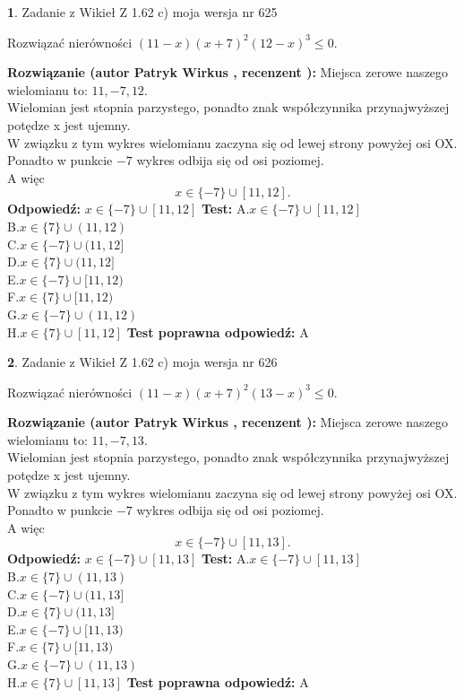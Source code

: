 \documentclass[12pt, a4paper]{article}
\theoremstyle{definition} %
\newtheorem{zad}{}
\newcommand{\zadStart}[1]{\begin{zad}#1\newline}
\newcommand{\zadStop}{\end{zad}}
\newcommand{\rozwStart}[2]{\noindent \textbf{Rozwiązanie (autor #1 , recenzent #2): }\newline}
\newcommand{\rozwStop}{\newline}
\newcommand{\odpStart}{\noindent \textbf{Odpowiedź:}\newline}
\newcommand{\odpStop}{\newline}
\newcommand{\testStart}{\noindent \textbf{Test:}\newline}
\newcommand{\testStop}{\newline}
\newcommand{\kluczStart}{\noindent \textbf{Test poprawna odpowiedź:}\newline}
\newcommand{\kluczStop}{\newline}
\begin{document}
\zadStart{Zadanie z Wikieł Z 1.62 c) moja wersja nr 625}

Rozwiązać nierówności $(11-x)(x+7)^{2}(12-x)^{3}\le0$.
\zadStop
\rozwStart{Patryk Wirkus}{}
Miejsca zerowe naszego wielomianu to: $11, -7, 12$.\\
Wielomian jest stopnia parzystego, ponadto znak współczynnika przy\linebreak najwyższej potędze x jest ujemny.\\ W związku z tym wykres wielomianu zaczyna się od lewej strony powyżej osi OX.\\
Ponadto w punkcie $-7$ wykres odbija się od osi poziomej.\\
A więc $$x \in \{-7\} \cup [11,12].$$
\rozwStop
\odpStart
$x \in \{-7\} \cup [11,12]$
\odpStop
\testStart
A.$x \in \{-7\} \cup [11,12]$\\
B.$x \in \{7\} \cup (11,12)$\\
C.$x \in \{-7\} \cup (11,12]$\\
D.$x \in \{7\} \cup (11,12]$\\
E.$x \in \{-7\} \cup [11,12)$\\
F.$x \in \{7\} \cup [11,12)$\\
G.$x \in \{-7\} \cup (11,12)$\\
H.$x \in \{7\} \cup [11,12]$
\testStop
\kluczStart
A
\kluczStop



\zadStart{Zadanie z Wikieł Z 1.62 c) moja wersja nr 626}

Rozwiązać nierówności $(11-x)(x+7)^{2}(13-x)^{3}\le0$.
\zadStop
\rozwStart{Patryk Wirkus}{}
Miejsca zerowe naszego wielomianu to: $11, -7, 13$.\\
Wielomian jest stopnia parzystego, ponadto znak współczynnika przy\linebreak najwyższej potędze x jest ujemny.\\ W związku z tym wykres wielomianu zaczyna się od lewej strony powyżej osi OX.\\
Ponadto w punkcie $-7$ wykres odbija się od osi poziomej.\\
A więc $$x \in \{-7\} \cup [11,13].$$
\rozwStop
\odpStart
$x \in \{-7\} \cup [11,13]$
\odpStop
\testStart
A.$x \in \{-7\} \cup [11,13]$\\
B.$x \in \{7\} \cup (11,13)$\\
C.$x \in \{-7\} \cup (11,13]$\\
D.$x \in \{7\} \cup (11,13]$\\
E.$x \in \{-7\} \cup [11,13)$\\
F.$x \in \{7\} \cup [11,13)$\\
G.$x \in \{-7\} \cup (11,13)$\\
H.$x \in \{7\} \cup [11,13]$
\testStop
\kluczStart
A
\kluczStop
\end{document}
